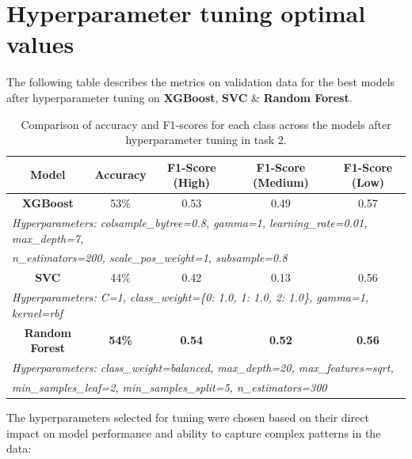 \documentclass{article}
\begin{document}
\section{Hyperparameter tuning optimal values}
\label{appendix:hyperparameter_tuning}
The following table describes the metrics on validation data for the best models after hyperparameter tuning on \textbf{XGBoost}, \textbf{SVC} \& \textbf{Random Forest}.
\begin{table}[h]
\centering
\begin{tabular}{|c|c|c|c|c|}
\hline
\textbf{Model}      & \textbf{Accuracy} & \textbf{F1-Score (High)} & \textbf{F1-Score (Medium)} & \textbf{F1-Score (Low)} \\ \hline
\textbf{XGBoost}    & 53\%              & 0.53                     & 0.49                       & 0.57                   \\ \hline
\multicolumn{5}{|l|}{\textit{\footnotesize{Hyperparameters: colsample\_bytree=0.8, gamma=1, learning\_rate=0.01, max\_depth=7,}}} \\ 
\multicolumn{5}{|l|}{\textit{\footnotesize{n\_estimators=200, scale\_pos\_weight=1, subsample=0.8}}} \\ \hline
\textbf{SVC}        & 44\%              & 0.42                     & 0.13                       & 0.56                   \\ \hline
\multicolumn{5}{|l|}{\textit{\footnotesize{Hyperparameters: C=1, class\_weight=\{0: 1.0, 1: 1.0, 2: 1.0\}, gamma=1, kernel=rbf}}} \\ \hline
\textbf{Random Forest} & \textbf{54\%}  & \textbf{0.54}            & \textbf{0.52}              & \textbf{0.56}          \\ \hline
\multicolumn{5}{|l|}{\textit{\footnotesize{Hyperparameters: class\_weight=balanced, max\_depth=20, max\_features=sqrt,}}} \\
\multicolumn{5}{|l|}{\textit{\footnotesize{min\_samples\_leaf=2, min\_samples\_split=5, n\_estimators=300}}} \\ \hline
\end{tabular}
\caption{Comparison of accuracy and F1-scores for each class across the models after hyperparameter tuning in task 2.}
\label{tab:f1_class_comparison_tuned}
\end{table}

The hyperparameters selected for tuning were chosen based on their direct impact on model performance and ability to capture complex patterns in the data:
\end{document}
